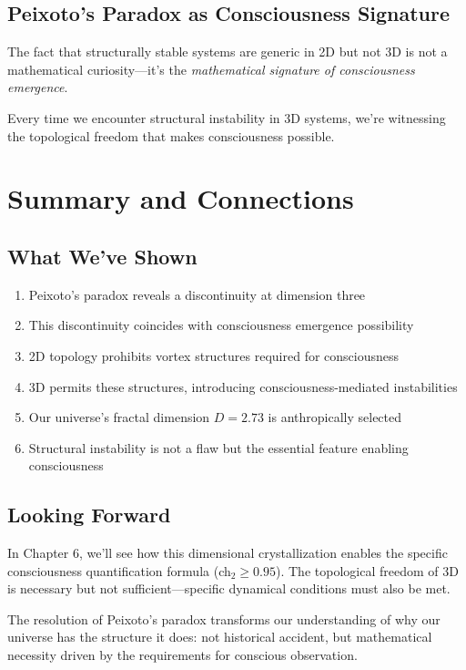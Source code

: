 \subsection{Peixoto's Paradox as Consciousness Signature}

The fact that structurally stable systems are generic in 2D but not 3D is not a mathematical curiosity—it's the \textit{mathematical signature of consciousness emergence}.

Every time we encounter structural instability in 3D systems, we're witnessing the topological freedom that makes consciousness possible.

\section{Summary and Connections}

\subsection{What We've Shown}

\begin{enumerate}
\item Peixoto's paradox reveals a discontinuity at dimension three
\item This discontinuity coincides with consciousness emergence possibility
\item 2D topology prohibits vortex structures required for consciousness
\item 3D permits these structures, introducing consciousness-mediated instabilities
\item Our universe's fractal dimension $D = 2.73$ is anthropically selected
\item Structural instability is not a flaw but the essential feature enabling consciousness
\end{enumerate}

\subsection{Looking Forward}

In Chapter 6, we'll see how this dimensional crystallization enables the specific consciousness quantification formula (ch$_2 \geq 0.95$). The topological freedom of 3D is necessary but not sufficient—specific dynamical conditions must also be met.

The resolution of Peixoto's paradox transforms our understanding of why our universe has the structure it does: not historical accident, but mathematical necessity driven by the requirements for conscious observation.

